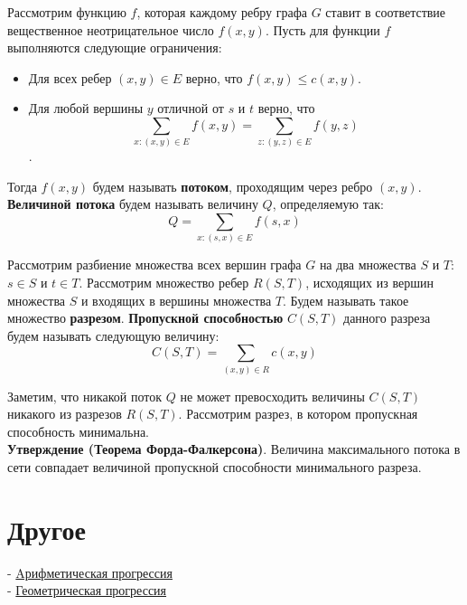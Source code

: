 \documentclass{article}
\begin{document}
Рассмотрим функцию $f$, которая каждому ребру графа $G$ ставит в соответствие вещественное неотрицательное число $f(x, y)$. Пусть для функции $f$ выполняются следующие ограничения:

\begin{itemize}
	\item Для всех ребер $(x, y) \in E$ верно, что $f(x, y) \le c(x, y)$.
	\item Для любой вершины $y$ отличной от $s$ и $t$ верно, что $$\sum_{x : (x, y) \in E} f(x, y) = \sum_{z : (y, z) \in E} f(y, z)$$.
\end{itemize}  

Тогда $f(x, y)$ будем называть \textbf{потоком}, проходящим через ребро $(x, y)$. \textbf{Величиной потока} будем называть величину $Q$, определяемую так: $$Q = \sum_{x: (s, x) \in E} f(s, x) $$

Рассмотрим разбиение множества всех вершин графа $G$ на два множества $S$ и $T$: $s \in S$ и $t \in T$. Рассмотрим множество ребер $R(S, T)$, исходящих из вершин множества $S$ и входящих в вершины множества $T$. Будем называть такое множество \textbf{разрезом}. \textbf{Пропускной способностью} $C(S, T)$ данного разреза будем называть следующую величину: $$ C(S, T) = \sum_{(x, y) \in R} c(x, y) $$

Заметим, что никакой поток $Q$ не может превосходить величины $C(S, T)$ никакого из разрезов $R(S, T)$. Рассмотрим разрез, в котором пропускная способность минимальна. \\

\textbf{Утверждение (Теорема Форда-Фалкерсона)}. Величина максимального потока в сети совпадает величиной пропускной способности минимального разреза.

\section{Другое}

- \href{https://ru.wikipedia.org/wiki/%D0%90%D1%80%D0%B8%D1%84%D0%BC%D0%B5%D1%82%D0%B8%D1%87%D0%B5%D1%81%D0%BA%D0%B0%D1%8F_%D0%BF%D1%80%D0%BE%D0%B3%D1%80%D0%B5%D1%81%D1%81%D0%B8%D1%8F}{Aрифметическая прогрессия} \\
- \href{https://ru.wikipedia.org/wiki/%D0%93%D0%B5%D0%BE%D0%BC%D0%B5%D1%82%D1%80%D0%B8%D1%87%D0%B5%D1%81%D0%BA%D0%B0%D1%8F_%D0%BF%D1%80%D0%BE%D0%B3%D1%80%D0%B5%D1%81%D1%81%D0%B8%D1%8F}{Геометрическая прогрессия} \\
\end{document}
